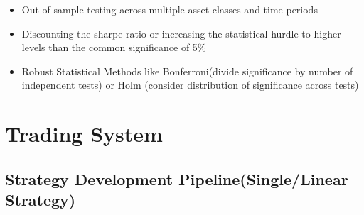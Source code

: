 \documentclass[11pt, openany]{book}              %
\begin{document}
\begin{itemize}
	\item Out of sample testing across multiple asset classes and time periods
	\item Discounting the sharpe ratio or increasing the statistical hurdle to higher levels than the common significance of 5\%
	\item Robust Statistical Methods like Bonferroni(divide significance by number of independent tests) or Holm (consider distribution of significance across tests)
\end{itemize}


\chapter{ Trading System }



\section{ Strategy Development Pipeline(Single/Linear Strategy) }
\end{document}
